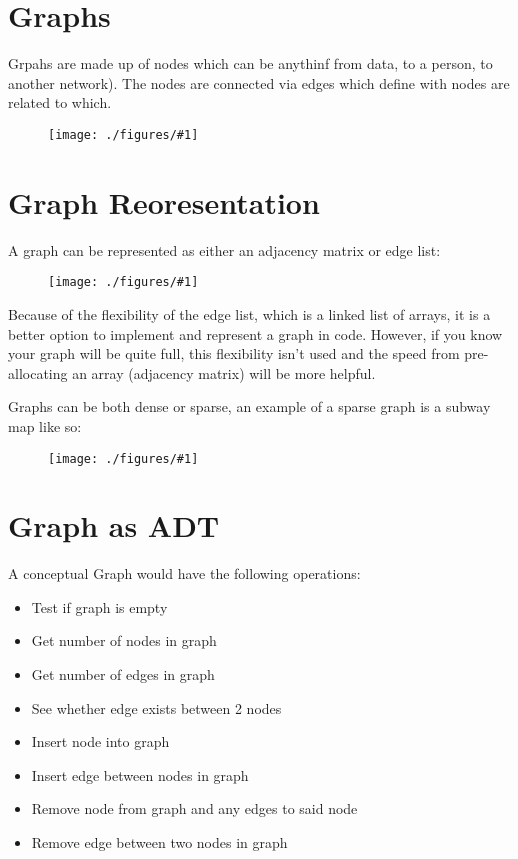 \documentclass[12pt]{book}
\title{\coursetitle\linebreak\lecturename}
\author{\\Cain Susko\\ 
           \\ \\ \\
      Queen's University 
    \\School of Computing\\}
\newcommand{\incimg}[2]{%
       \begin{figure}[h]
               \centering
               \texttt{[image: ./figures/\#1]}
       \end{figure}
}
\begin{document}
\begin{titlepage}
        \maketitle
\end{titlepage}


\section*{Graphs}
Grpahs are made up of nodes which can be anythinf from data, to a person, to 
another network). The nodes are connected via edges which define with 
nodes are related to which.
\incimg{graph}{0.7}

\section*{Graph Reoresentation}
A graph can be represented as either an adjacency matrix or edge list:
\incimg{Amat}{0.5}

Because of the flexibility of the edge list, which is a linked list of arrays, 
it is a better option to implement and represent a graph in code. However, if 
you know your graph will be quite full, this flexibility isn't used and the speed
from pre-allocating an array (adjacency matrix) will be more helpful.

Graphs can be both dense or sparse, an example of a sparse graph is a subway map
like so:
\incimg{subway}{0.5}
\pagebreak

\section*{Graph as ADT}
A conceptual Graph would have the following operations:
\begin{itemize}
        \item Test if graph is empty
        \item Get number of nodes in graph
        \item Get number of edges in graph
        \item See whether edge exists between 2 nodes
        \item Insert node into graph
        \item Insert edge between nodes in graph
        \item Remove node from graph and any edges to said node
        \item Remove edge between two nodes in graph
\end{itemize}
\end{document}
